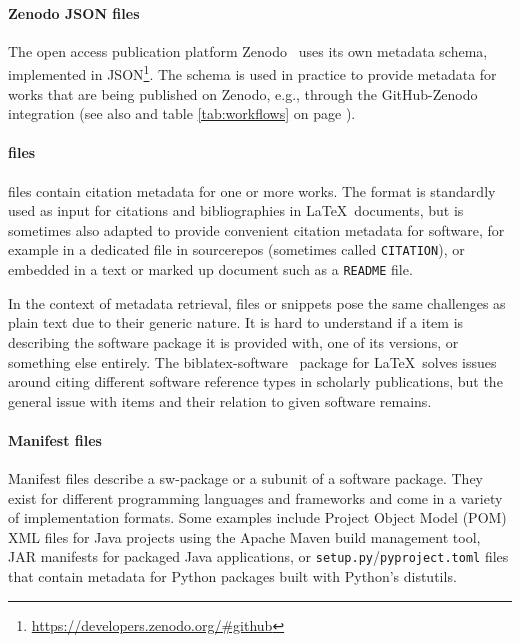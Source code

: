 \documentclass[11pt,a4paper]{scrartcl}
\newcommand{\fn}[1]{\texttt{#1}}
\begin{document}
\paragraph{Zenodo JSON files}\label{par:metadata-formats-zenodo-json}
The open access publication platform Zenodo~\cite{Zenodo} uses its own metadata schema, implemented in JSON\footnote{\url{https://developers.zenodo.org/\#github}}. The schema is used in practice to provide metadata for works that are being published on Zenodo, e.g., through the GitHub-Zenodo integration (see also  and table \ref{tab:workflows} on page \pageref{tab:workflows}).

\paragraph{ files}\label{par:metadata-formats-bibtex}
 files contain citation metadata for one or more works. The format is standardly used as input for citations and bibliographies
in \LaTeX\ documents, but is sometimes also adapted to provide convenient citation metadata for software, for example in a dedicated file in
\glspl{sourcerepo} (sometimes called \fn{CITATION}), or embedded in a text or marked up document such as a \fn{README} file. 

In the context of metadata retrieval,  files or snippets pose the same challenges as plain text due to their generic nature.
It is hard to understand if a  item is describing the software package it is provided with, one of its versions, or something
else entirely. The biblatex-software~\cite{sw:biblatex-software} package for \LaTeX\ solves issues around citing different software reference
types in scholarly publications, but the general issue with  items and their relation to given software remains.

\paragraph{Manifest files}\label{par:metadata-formats-manifests}
Manifest files describe a \gls{sw-package} or a subunit of a software package. They exist for different programming languages and frameworks and come in a variety of implementation formats. Some examples include Project Object Model (POM) XML files for Java projects using the Apache Maven build management tool, JAR manifests for packaged Java applications, or \fn{setup.py}/\fn{pyproject.toml} files that contain metadata for Python packages built with Python’s distutils.
\end{document}

